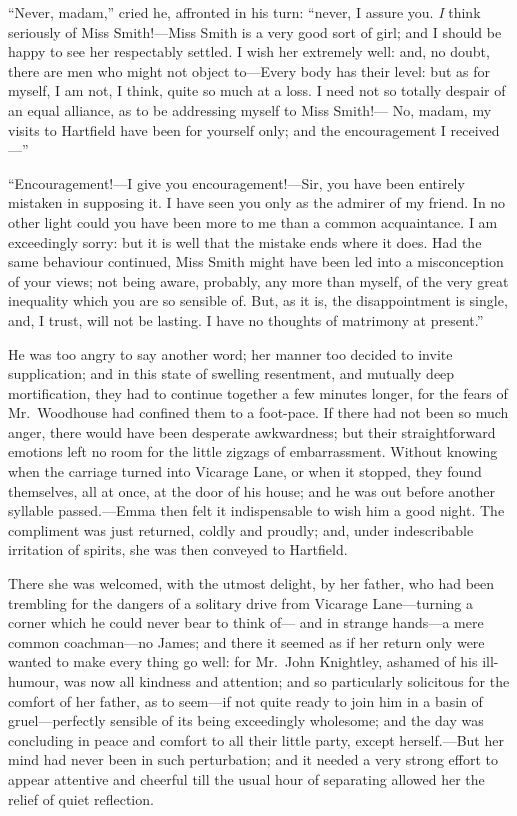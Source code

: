 ``Never, madam,'' cried he, affronted in his turn:  ``never, I assure you.
\emph{I} think seriously of Miss Smith!---Miss Smith is a very good sort
of girl; and I should be happy to see her respectably settled.
I wish her extremely well:  and, no doubt, there are men who might not
object to---Every body has their level:  but as for myself, I am not,
I think, quite so much at a loss.  I need not so totally despair
of an equal alliance, as to be addressing myself to Miss Smith!---%
No, madam, my visits to Hartfield have been for yourself only;
and the encouragement I received---''

``Encouragement!---I give you encouragement!---Sir, you have been entirely
mistaken in supposing it.  I have seen you only as the admirer
of my friend.  In no other light could you have been more to me than
a common acquaintance.  I am exceedingly sorry:  but it is well that
the mistake ends where it does.  Had the same behaviour continued,
Miss Smith might have been led into a misconception of your views;
not being aware, probably, any more than myself, of the very
great inequality which you are so sensible of.  But, as it is,
the disappointment is single, and, I trust, will not be lasting.
I have no thoughts of matrimony at present.''

He was too angry to say another word; her manner too decided
to invite supplication; and in this state of swelling resentment,
and mutually deep mortification, they had to continue together a few
minutes longer, for the fears of Mr.\ Woodhouse had confined them
to a foot-pace. If there had not been so much anger, there would have
been desperate awkwardness; but their straightforward emotions left
no room for the little zigzags of embarrassment.  Without knowing
when the carriage turned into Vicarage Lane, or when it stopped,
they found themselves, all at once, at the door of his house;
and he was out before another syllable passed.---Emma then felt it
indispensable to wish him a good night.  The compliment was just returned,
coldly and proudly; and, under indescribable irritation of spirits,
she was then conveyed to Hartfield.

There she was welcomed, with the utmost delight, by her father,
who had been trembling for the dangers of a solitary drive from
Vicarage Lane---turning a corner which he could never bear to think of---%
and in strange hands---a mere common coachman---no James; and there it
seemed as if her return only were wanted to make every thing go well:
for Mr.\ John Knightley, ashamed of his ill-humour, was now all
kindness and attention; and so particularly solicitous for the comfort
of her father, as to seem---if not quite ready to join him in a basin
of gruel---perfectly sensible of its being exceedingly wholesome;
and the day was concluding in peace and comfort to all their little party,
except herself.---But her mind had never been in such perturbation;
and it needed a very strong effort to appear attentive and cheerful till
the usual hour of separating allowed her the relief of quiet reflection.



